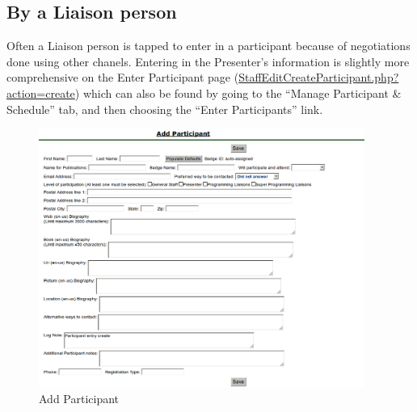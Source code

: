 \documentclass[tablesignature]{scrartcl}
\begin{document}
\subsection{By a Liaison person}
\label{sec-2_2}


   Often a Liaison person is tapped to enter in a participant because
   of negotiations done using other chanels.  Entering in the
   Presenter's information is slightly more comprehensive on the Enter
   Participant page (\hyperref[StaffEditCreateParticipant.php?action=create]{StaffEditCreateParticipant.php?action=create})
   which can also be found by going to the ``Manage Participant \&
   Schedule'' tab, and then choosing the ``Enter Participants'' link.


\begin{figure}[H]
\centering
\includegraphics[width=0.95\textwidth]{./Images/Add_Participant.png}
\caption{\label{fig:Zambia_Presenter_Flow_Add_Participant}Add Participant}
\end{figure}
\end{document}
